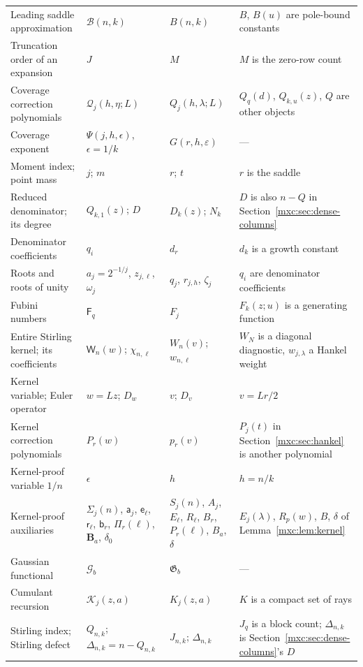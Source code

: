 \documentclass[11pt]{article}
\numberwithin{equation}{section}
\theoremstyle{definition}
\theoremstyle{remark}
\begin{document}
{\begin{longtable}{@{}>{\raggedright\arraybackslash}p{}>{\raggedright\arraybackslash}p{}>{\raggedright\arraybackslash}p{}>{\raggedright\arraybackslash}p{}@{}}
Leading saddle approximation & $\mathcal B(n,k)$ & $B(n,k)$ & $B$, $B(u)$ are pole-bound constants\\
Truncation order of an expansion & $J$ & $M$ & $M$ is the zero-row count\\
Coverage correction polynomials & $\mathcal Q_j(h,\eta;L)$ & $Q_j(h,\lambda;L)$ & $Q_q(d)$, $Q_{k,u}(z)$, $Q$ are other objects\\
Coverage exponent & $\Psi(j,h,\epsilon)$, $\epsilon=1/k$ & $G(r,h,\varepsilon)$ & ---\\
Moment index; point mass & $j$; $m$ & $r$; $t$ & $r$ is the saddle\\
Reduced denominator; its degree & $Q_{k,1}(z)$; $D$ & $D_k(z)$; $N_k$ & $D$ is also $n-Q$ in Section~\ref{mxc:sec:dense-columns}\\
Denominator coefficients & $q_i$ & $d_r$ & $d_k$ is a growth constant\\
Roots and roots of unity & $a_j=2^{-1/j}$, $z_{j,\ell}$, $\omega_j$ & $q_j$, $r_{j,h}$, $\zeta_j$ & $q_i$ are denominator coefficients\\
Fubini numbers & $\mathsf F_q$ & $F_j$ & $F_k(z;u)$ is a generating function\\
Entire Stirling kernel; its coefficients & $\mathsf W_n(w)$; $\chi_{n,\ell}$ & $W_n(v)$; $w_{n,\ell}$ & $W_N$ is a diagonal diagnostic, $w_{j,\lambda}$ a Hankel weight\\
Kernel variable; Euler operator & $w=Lz$; $D_w$ & $v$; $D_v$ & $v=Lr/2$\\
Kernel correction polynomials & $P_r(w)$ & $p_r(v)$ & $P_j(t)$ in Section~\ref{mxc:sec:hankel} is another polynomial\\
Kernel-proof variable $1/n$ & $\epsilon$ & $h$ & $h=n/k$\\
Kernel-proof auxiliaries & $\Sigma_j(n)$, $\mathsf a_j$, $\mathsf e_\ell$, $\mathsf r_\ell$, $\mathsf b_r$, $\Pi_r(\ell)$, $\mathbf B_a$, $\delta_0$ & $S_j(n)$, $A_j$, $E_\ell$, $R_\ell$, $B_r$, $P_r(\ell)$, $B_a$, $\delta$ & $E_j(\lambda)$, $R_p(w)$, $B$, $\delta$ of Lemma~\ref{mxc:lem:kernel}\\
Gaussian functional & $\mathcal G_b$ & $\mathfrak G_b$ & ---\\
Cumulant recursion & $\mathcal K_j(z,a)$ & $K_j(z,a)$ & $K$ is a compact set of rays\\
Stirling index; Stirling defect & $Q_{n,k}$; $\Delta_{n,k}=n-Q_{n,k}$ & $J_{n,k}$; $\Delta_{n,k}$ & $J_q$ is a block count; $\Delta_{n,k}$ is Section~\ref{mxc:sec:dense-columns}'s $D$\\

\end{longtable}}
\end{document}
